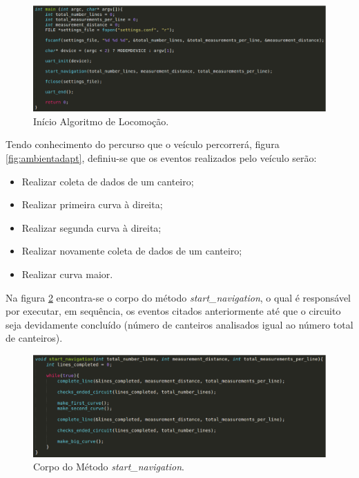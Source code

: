   \begin{figure}[!htbp]
  \begin{center}
  \includegraphics[width=1\textwidth]{figuras/main.eps}
  \caption{\label{fig:main_algoritmo}Início Algoritmo de Locomoção.}
  \end{center}
  \end{figure}

  Tendo conhecimento do percurso que o veículo percorrerá, figura \ref{fig:ambientadapt}, definiu-se que os eventos realizados pelo veículo serão:
  \begin{itemize}
    \item Realizar coleta de dados de um canteiro;
    \item Realizar primeira curva à direita;
    \item Realizar segunda curva à direita;
    \item Realizar novamente coleta de dados de um canteiro;
    \item Realizar curva maior.
  \end{itemize}

  Na figura \ref{fig:start_navigation} encontra-se o corpo do método \textit{start\_navigation}, o qual
  é responsável por executar, em sequência, os eventos citados anteriormente até que o circuito
  seja devidamente concluído (número de canteiros analisados igual ao número total de canteiros).

  \begin{figure}[!htbp]
  \begin{center}
  \includegraphics[width=1\textwidth]{figuras/start_navigation.eps}
  \caption{\label{fig:start_navigation}Corpo do Método \textit{start\_navigation}.}
  \end{center}
  \end{figure}

